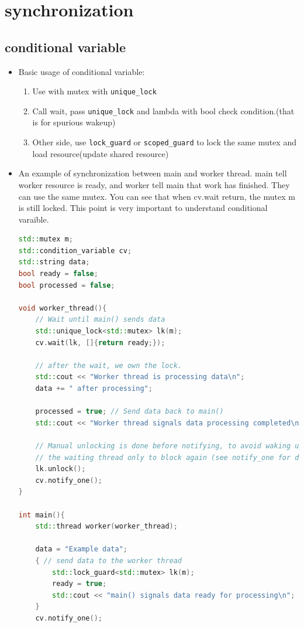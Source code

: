 \documentclass[a4paper,11pt,twoside]{book}
\begin{document}
\section{synchronization}
\subsection{conditional variable}
\begin{itemize}

	\item Basic usage of conditional variable:

\begin{enumerate}
	\item Use with mutex with \texttt{unique\_lock} 
	\item Call wait, pass \texttt{unique\_lock} and lambda with bool check condition.(that is for spurious wakeup)
	\item Other side, use \texttt{lock\_guard} or \texttt{scoped\_guard} to lock the same mutex and load resource(update shared resource)
\end{enumerate}

\item An example of synchronization between main and worker thread. main tell worker resource is ready, and worker tell main that work has finished. They can use the same mutex. You can see that when cv.wait return, the mutex m is still locked. This point is very important to understand conditional varaible. 

\begin{lstlisting}[frame=single, language=c++]
std::mutex m;
std::condition_variable cv;
std::string data;
bool ready = false;
bool processed = false;

void worker_thread(){
	// Wait until main() sends data
	std::unique_lock<std::mutex> lk(m);
	cv.wait(lk, []{return ready;});
	
	// after the wait, we own the lock.
	std::cout << "Worker thread is processing data\n";
	data += " after processing";
	
	processed = true; // Send data back to main()
	std::cout << "Worker thread signals data processing completed\n";
	
	// Manual unlocking is done before notifying, to avoid waking up
	// the waiting thread only to block again (see notify_one for details)
	lk.unlock();
	cv.notify_one();
}

int main(){
	std::thread worker(worker_thread);
	
	data = "Example data";
	{ // send data to the worker thread
		std::lock_guard<std::mutex> lk(m);
		ready = true;
		std::cout << "main() signals data ready for processing\n";
	}
	cv.notify_one();
	

\end{lstlisting}
\end{itemize}
\end{document}
